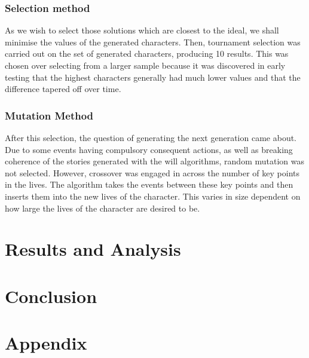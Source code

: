 \documentclass[11pt]{article}
\begin{document}
\subsubsection{Selection method}
As we wish to select those solutions which are closest to the ideal, we shall minimise the values of the generated characters. Then, tournament selection was carried out on the set of generated characters, producing 10 results. This was chosen over selecting from a larger sample because it was discovered in early testing that the highest characters generally had much lower values and that the difference tapered off over time. 

\subsubsection{Mutation Method}
After this selection, the question of generating the next generation came about. Due to some events having compulsory consequent actions, as well as breaking coherence of the stories generated with the will algorithms, random mutation was not selected. However, crossover was engaged in across the number of key points in the lives. The algorithm takes the events between these key points and then inserts them into the new lives of the character. This varies in size dependent on how large the lives of the character are desired to be. 


\section{Results and Analysis}

\section{Conclusion}


\printbibliography

\section{Appendix}
\end{document}
